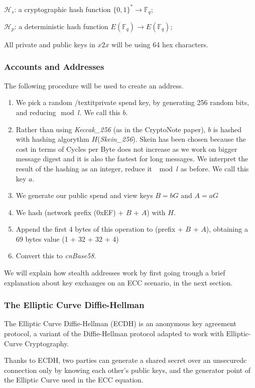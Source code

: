 $\mathcal{H}_s$: a cryptographic hash function $\{0,1\}^*\rightarrow\mathbb{F}_q$;

$\mathcal{H}_p$: a deterministic hash function $E(\mathbb{F}_q)\rightarrow E(\mathbb{F}_q)$;

All private and public keys in $x2x$ will be using 64 hex characters.

\subsubsection{Accounts and Addresses}

The following procedure will be used to create an address.

\begin{enumerate}
\item  We pick a random /textit{private spend key}, by generating 256 random bits, and reducing$\mod l$. We call this $b$.
\item  Rather than using \textit{Keccak\_256} (as in the CryptoNote paper), $b$ is hashed with hashing algorythm $H$(\textit{Skein\_256}). Skein has been chosen because the cost in terms of Cycles per Byte does not increase as we work on bigger message digest and it is also the fastest for long messages. We interpret the result of the hashing as an integer, reduce it $\mod l$ as before. We call this key $a$.  
\item  We generate our public spend and view keys $B=bG$ and $A=aG$
\item  We hash (network prefix (0xEF) + $B$ + $A$) with $H$.
\item  Append the first 4 bytes of this operation to (prefix + $B$ + $A$), obtaining a 69 bytes value (1 + 32 + 32 + 4)
\item  Convert this to \textit{cnBase58}.
\end{enumerate}

We will explain how stealth addresses work by first going trough a brief explanation about key exchanges on an ECC scenario, in the next section.

\subsubsection{The Elliptic Curve Diffie-Hellman}

The Elliptic Curve Diffie-Hellman (ECDH) is an anonymous key agreement protocol, a variant of the Diffie-Hellman protocol adapted to work with Elliptic-Curve Cryptography.

Thanks to ECDH, two parties can generate a shared secret over an unsecuredc connection only by knowing each other's public keys, and the generator point of the Elliptic Curve used in the ECC equation.

